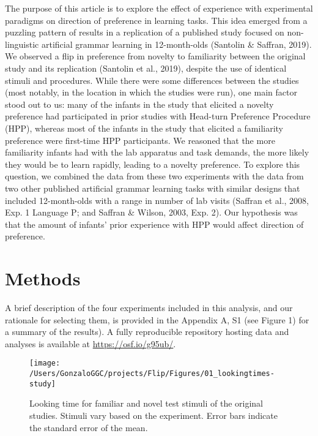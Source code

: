 \documentclass[english,man,man,floatsintext]{apa6}
\begin{document}
The purpose of this article is to explore the effect of experience with experimental paradigms on direction of preference in learning tasks. This idea emerged from a puzzling pattern of results in a replication of a published study focused on non-linguistic artificial grammar learning in 12-month-olds (Santolin \& Saffran, 2019). We observed a flip in preference from novelty to familiarity between the original study and its replication (Santolin et al., 2019), despite the use of identical stimuli and procedures. While there were some differences between the studies (most notably, in the location in which the studies were run), one main factor stood out to us: many of the infants in the study that elicited a novelty preference had participated in prior studies with Head-turn Preference Procedure (HPP), whereas most of the infants in the study that elicited a familiarity preference were first-time HPP participants. We reasoned that the more familiarity infants had with the lab apparatus and task demands, the more likely they would be to learn rapidly, leading to a novelty preference. To explore this question, we combined the data from these two experiments with the data from two other published artificial grammar learning tasks with similar designs that included 12-month-olds with a range in number of lab visits (Saffran et al., 2008, Exp. 1 Language P; and Saffran \& Wilson, 2003, Exp. 2). Our hypothesis was that the amount of infants' prior experience with HPP would affect direction of preference.

\hypertarget{methods}{%
\section{Methods}\label{methods}}

A brief description of the four experiments included in this analysis, and our rationale for selecting them, is provided in the Appendix A, S1 (see Figure 1) for a summary of the results). A fully reproducible repository hosting data and analyses is available at \url{https://osf.io/g95ub/}.

\begin{figure}
\texttt{[image: /Users/GonzaloGGC/projects/Flip/Figures/01\_lookingtimes-study]} \caption{Looking time for familiar and novel test stimuli of the original studies. Stimuli vary based on the experiment. Error bars indicate the standard error of the mean.}\label{fig:fig1}
\end{figure}
\end{document}

